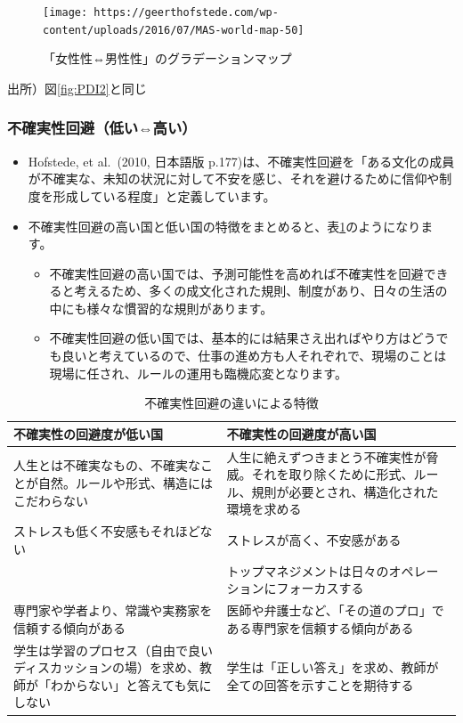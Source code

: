 \documentclass[
]{book}
\begin{document}
\begin{figure}
\texttt{[image: https://geerthofstede.com/wp-content/uploads/2016/07/MAS-world-map-50]} \caption{「女性性⇔男性性」のグラデーションマップ}\label{fig:MAS2}
\end{figure}

出所）図\ref{fig:PDI2}と同じ

\hypertarget{ux4e0dux78baux5b9fux6027ux56deux907fux4f4eux3044ux9ad8ux3044}{%
\subsubsection{不確実性回避（低い⇔高い）}\label{ux4e0dux78baux5b9fux6027ux56deux907fux4f4eux3044ux9ad8ux3044}}

\begin{itemize}
\item
  Hofstede, et al.~(2010, 日本語版 p.177)は、不確実性回避を「ある文化の成員が不確実な、未知の状況に対して不安を感じ、それを避けるために信仰や制度を形成している程度」と定義しています。
\item
  不確実性回避の高い国と低い国の特徴をまとめると、表\ref{tab:UAI0}のようになります。

  \begin{itemize}
  \item
    不確実性回避の高い国では、予測可能性を高めれば不確実性を回避できると考えるため、多くの成文化された規則、制度があり、日々の生活の中にも様々な慣習的な規則があります。
  \item
    不確実性回避の低い国では、基本的には結果さえ出ればやり方はどうでも良いと考えているので、仕事の進め方も人それぞれで、現場のことは現場に任され、ルールの運用も臨機応変となります。
  \end{itemize}
\end{itemize}

\begin{table}

\caption{\label{tab:UAI0}不確実性回避の違いによる特徴}
\centering
\begin{tabular}[t]{l|l}
\hline
不確実性の回避度が低い国 & 不確実性の回避度が高い国\\
\hline
人生とは不確実なもの、不確実なことが自然。ルールや形式、構造にはこだわらない & 人生に絶えずつきまとう不確実性が脅威。それを取り除くために形式、ルール、規則が必要とされ、構造化された環境を求める\\
\hline
ストレスも低く不安感もそれほどない & ストレスが高く、不安感がある\\
\hline
 & トップマネジメントは日々のオペレーションにフォーカスする\\
\hline
専門家や学者より、常識や実務家を信頼する傾向がある & 医師や弁護士など、「その道のプロ」である専門家を信頼する傾向がある\\
\hline
学生は学習のプロセス（自由で良いディスカッションの場）を求め、教師が「わからない」と答えても気にしない & 学生は「正しい答え」を求め、教師が全ての回答を示すことを期待する\\
\hline
\end{tabular}
\end{table}
\end{document}
